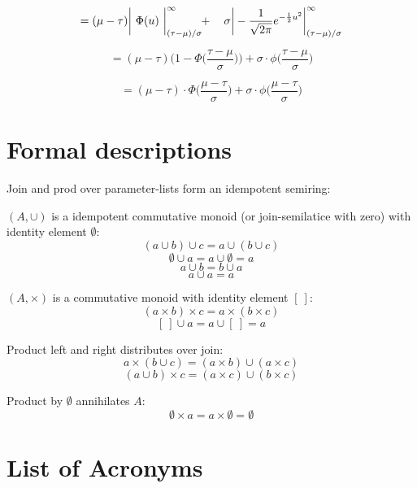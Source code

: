 \documentclass[english]{article}
\begin{document}
$$=(\mu-\tau)\bigg|\ \Phi(u)\ \bigg|_{(\tau-\mu)/\sigma}^{\infty} \mkern-6mu + \ \ \ \sigma\bigg|-\frac{1}{\sqrt{2\pi}}e^{-\frac{1}{2}u^2}\bigg|_{(\tau-\mu)/\sigma}^{\infty}$$

$$=(\mu-\tau)\bigg(1-\Phi\bigg(\frac{\tau-\mu}{\sigma}\bigg)\bigg) + \sigma \cdot \phi \bigg(\frac{\tau-\mu}{\sigma}\bigg)$$

$$ = (\mu - \tau) \cdot \Phi \bigg(\frac{\mu-\tau}{\sigma}\bigg) + \sigma \cdot \phi \bigg(\frac{\mu-\tau}{\sigma}\bigg)$$


\section{Formal descriptions}
Join and prod over parameter-lists form an idempotent semiring:

$(A, \cup)$ is a idempotent commutative monoid (or join-semilatice with zero) with identity element $\emptyset$:
$$(a \cup b) \cup c = a \cup (b \cup c)$$
$$\emptyset \cup a = a \cup \emptyset = a$$
$$a \cup b = b \cup a$$
$$a \cup a = a$$

$(A, \times)$ is a commutative monoid with identity element $[\ ]$:
$$(a \times b) \times c = a \times (b \times c)$$
$$[\ ] \cup a = a \cup [\ ] = a$$

Product left and right distributes over join:
$$a\times(b \cup c) = (a\times b) \cup (a\times c)$$
$$(a \cup b)\times c = (a\times c) \cup (b\times c)$$

Product by $\emptyset$ annihilates $A$:
$$\emptyset \times a = a \times \emptyset = \emptyset$$


\section*{List of Acronyms}
\begin{acronym}
\end{acronym}


\printbibliography
\end{document}
